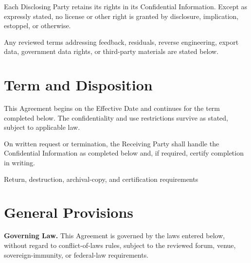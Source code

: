 \documentclass{linearspace-legal}
\begin{document}
\begin{LSForm}
\begin{legalclauses}
  \item Each Disclosing Party retains its rights in its Confidential
  Information. Except as expressly stated, no license or other right is granted
  by disclosure, implication, estoppel, or otherwise.

  \item Any reviewed terms addressing feedback, residuals, reverse engineering,
  export data, government data rights, or third-party materials are stated
  below.

\end{legalclauses}

\section{Term and Disposition}

\begin{legalclauses}
  \item This Agreement begins on the Effective Date and continues for the term
  completed below. The confidentiality and use restrictions survive as stated,
  subject to applicable law.


  \item On written request or termination, the Receiving Party shall handle the
  Confidential Information as completed below and, if required, certify
  completion in writing.

    {Return, destruction, archival-copy, and certification requirements}
\end{legalclauses}

\section{General Provisions}

\begin{legalclauses}
  \item \textbf{Governing Law.} This Agreement is governed by the laws entered
  below, without regard to conflict-of-laws rules, subject to the reviewed forum,
  venue, sovereign-immunity, or federal-law requirements.


\end{legalclauses}
\end{LSForm}
\end{document}
